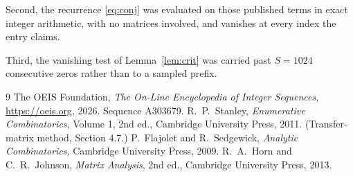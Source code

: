 \documentclass[11pt,a4paper]{article}
\theoremstyle{plain}
\theoremstyle{definition}
\begin{document}
Second, the recurrence \eqref{eq:conj} was evaluated on those published terms in exact
integer arithmetic, with no matrices involved, and vanishes at every index the entry claims.

Third, the vanishing test of Lemma~\ref{lem:crit} was carried past $S=1024$ consecutive
zeros rather than to a sampled prefix.

\begin{thebibliography}{9}
 The OEIS Foundation, \emph{The On-Line Encyclopedia of Integer
Sequences}, \url{https://oeis.org}, 2026. Sequence A303679.
 R.~P.~Stanley, \emph{Enumerative Combinatorics}, Volume 1, 2nd ed.,
Cambridge University Press, 2011. (Transfer-matrix method, Section 4.7.)
 P.~Flajolet and R.~Sedgewick, \emph{Analytic Combinatorics}, Cambridge
University Press, 2009.
 R.~A.~Horn and C.~R.~Johnson, \emph{Matrix Analysis}, 2nd ed., Cambridge
University Press, 2013.
\end{thebibliography}
\end{document}
